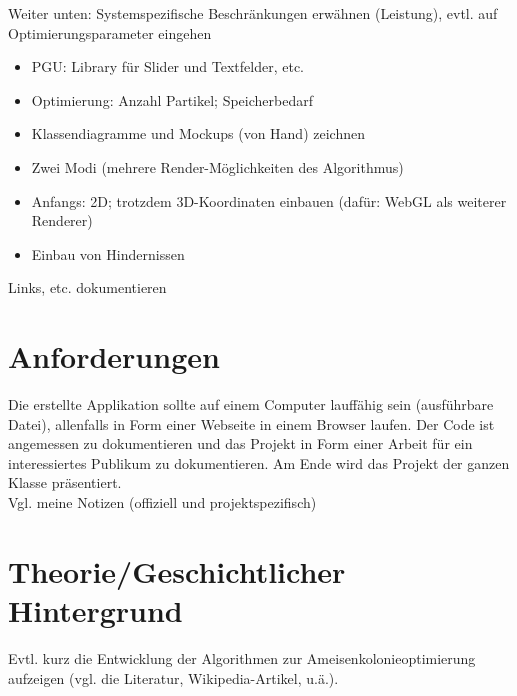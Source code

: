 \vspace*{1cm}

Weiter unten: Systemspezifische Beschränkungen erwähnen (Leistung), evtl. auf Optimierungsparameter eingehen

\vspace*{1cm} 

\begin{itemize}[noitemsep]
\item PGU: Library für Slider und Textfelder, etc.
\item Optimierung: Anzahl Partikel; Speicherbedarf
\item Klassendiagramme und Mockups (von Hand) zeichnen
\item Zwei Modi (mehrere Render-Möglichkeiten des Algorithmus)
\item Anfangs: 2D; trotzdem 3D-Koordinaten einbauen (dafür: WebGL als weiterer Renderer)
\item Einbau von Hindernissen
\end{itemize}


Links, etc. dokumentieren \\


\vspace*{1cm}




\section{Anforderungen}

Die erstellte Applikation sollte auf einem Computer lauffähig sein (ausführbare Datei), allenfalls in Form einer Webseite in einem Browser laufen. Der Code ist angemessen zu dokumentieren und das Projekt in Form einer Arbeit für ein interessiertes Publikum zu dokumentieren. Am Ende wird das Projekt der ganzen Klasse präsentiert. \\


Vgl. meine Notizen (offiziell und projektspezifisch) \\




\section{Theorie/Geschichtlicher Hintergrund} 

Evtl. kurz die Entwicklung der Algorithmen zur Ameisenkolonieoptimierung aufzeigen (vgl. die Literatur, Wikipedia-Artikel, u.ä.).


